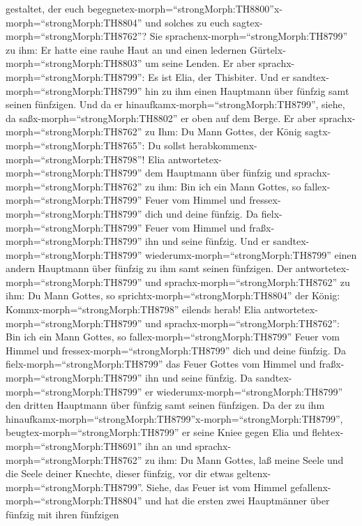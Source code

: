 gestaltet, der euch
begegnetex-morph=``strongMorph:TH8800''x-morph=``strongMorph:TH8804''
und solches zu euch sagtex-morph=``strongMorph:TH8762''? 
Sie sprachenx-morph=``strongMorph:TH8799'' zu ihm: Er hatte eine rauhe
Haut an und einen ledernen Gürtelx-morph=``strongMorph:TH8803'' um seine
Lenden. Er aber sprachx-morph=``strongMorph:TH8799'': Es ist Elia, der
Thisbiter.  Und er sandtex-morph=``strongMorph:TH8799'' hin
zu ihm einen Hauptmann über fünfzig samt seinen fünfzigen. Und da er
hinaufkamx-morph=``strongMorph:TH8799'', siehe, da
saßx-morph=``strongMorph:TH8802'' er oben auf dem Berge. Er aber
sprachx-morph=``strongMorph:TH8762'' zu Ihm: Du Mann Gottes, der König
sagtx-morph=``strongMorph:TH8765'': Du sollst
herabkommenx-morph=``strongMorph:TH8798''!  Elia
antwortetex-morph=``strongMorph:TH8799'' dem Hauptmann über fünfzig und
sprachx-morph=``strongMorph:TH8762'' zu ihm: Bin ich ein Mann Gottes, so
fallex-morph=``strongMorph:TH8799'' Feuer vom Himmel und
fressex-morph=``strongMorph:TH8799'' dich und deine fünfzig. Da
fielx-morph=``strongMorph:TH8799'' Feuer vom Himmel und
fraßx-morph=``strongMorph:TH8799'' ihn und seine fünfzig. 
Und er sandtex-morph=``strongMorph:TH8799''
wiederumx-morph=``strongMorph:TH8799'' einen andern Hauptmann über
fünfzig zu ihm samt seinen fünfzigen. Der
antwortetex-morph=``strongMorph:TH8799'' und
sprachx-morph=``strongMorph:TH8762'' zu ihm: Du Mann Gottes, so
sprichtx-morph=``strongMorph:TH8804'' der König:
Kommx-morph=``strongMorph:TH8798'' eilends herab!  Elia
antwortetex-morph=``strongMorph:TH8799'' und
sprachx-morph=``strongMorph:TH8762'': Bin ich ein Mann Gottes, so
fallex-morph=``strongMorph:TH8799'' Feuer vom Himmel und
fressex-morph=``strongMorph:TH8799'' dich und deine fünfzig. Da
fielx-morph=``strongMorph:TH8799'' das Feuer Gottes vom Himmel und
fraßx-morph=``strongMorph:TH8799'' ihn und seine fünfzig. 
Da sandtex-morph=``strongMorph:TH8799'' er
wiederumx-morph=``strongMorph:TH8799'' den dritten Hauptmann über
fünfzig samt seinen fünfzigen. Da der zu ihm
hinaufkamx-morph=``strongMorph:TH8799''x-morph=``strongMorph:TH8799'',
beugtex-morph=``strongMorph:TH8799'' er seine Kniee gegen Elia und
flehtex-morph=``strongMorph:TH8691'' ihn an und
sprachx-morph=``strongMorph:TH8762'' zu ihm: Du Mann Gottes, laß meine
Seele und die Seele deiner Knechte, dieser fünfzig, vor dir etwas
geltenx-morph=``strongMorph:TH8799''.  Siehe, das Feuer ist
vom Himmel gefallenx-morph=``strongMorph:TH8804'' und hat die ersten
zwei Hauptmänner über fünfzig mit ihren fünfzigen
